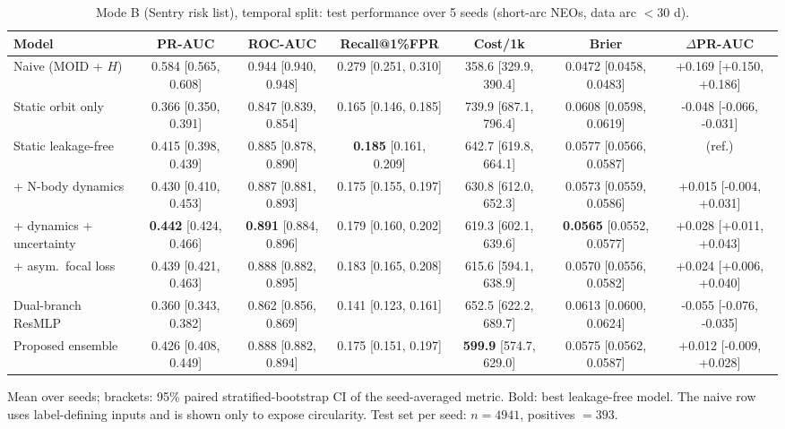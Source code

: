 \begin{table}[t]
\centering
\small
\caption{Mode B (Sentry risk list), temporal split: test performance over 5 seeds (short-arc NEOs, data arc $<30$ d).}
\label{tab:sentry_temporal_short_arc}
\begin{tabular}{lcccccc}
\toprule
Model & PR-AUC & ROC-AUC & Recall@1\%FPR & Cost/1k & Brier & $\Delta$PR-AUC \\
\midrule
Naive (MOID + $H$) & 0.584 \scriptsize{[0.565, 0.608]} & 0.944 \scriptsize{[0.940, 0.948]} & 0.279 \scriptsize{[0.251, 0.310]} & 358.6 \scriptsize{[329.9, 390.4]} & 0.0472 \scriptsize{[0.0458, 0.0483]} & +0.169 \scriptsize{[+0.150, +0.186]} \\
\midrule
Static orbit only & 0.366 \scriptsize{[0.350, 0.391]} & 0.847 \scriptsize{[0.839, 0.854]} & 0.165 \scriptsize{[0.146, 0.185]} & 739.9 \scriptsize{[687.1, 796.4]} & 0.0608 \scriptsize{[0.0598, 0.0619]} & -0.048 \scriptsize{[-0.066, -0.031]} \\
Static leakage-free & 0.415 \scriptsize{[0.398, 0.439]} & 0.885 \scriptsize{[0.878, 0.890]} & \textbf{0.185} \scriptsize{[0.161, 0.209]} & 642.7 \scriptsize{[619.8, 664.1]} & 0.0577 \scriptsize{[0.0566, 0.0587]} & (ref.) \\
+ N-body dynamics & 0.430 \scriptsize{[0.410, 0.453]} & 0.887 \scriptsize{[0.881, 0.893]} & 0.175 \scriptsize{[0.155, 0.197]} & 630.8 \scriptsize{[612.0, 652.3]} & 0.0573 \scriptsize{[0.0559, 0.0586]} & +0.015 \scriptsize{[-0.004, +0.031]} \\
+ dynamics + uncertainty & \textbf{0.442} \scriptsize{[0.424, 0.466]} & \textbf{0.891} \scriptsize{[0.884, 0.896]} & 0.179 \scriptsize{[0.160, 0.202]} & 619.3 \scriptsize{[602.1, 639.6]} & \textbf{0.0565} \scriptsize{[0.0552, 0.0577]} & +0.028 \scriptsize{[+0.011, +0.043]} \\
+ asym.\ focal loss & 0.439 \scriptsize{[0.421, 0.463]} & 0.888 \scriptsize{[0.882, 0.895]} & 0.183 \scriptsize{[0.165, 0.208]} & 615.6 \scriptsize{[594.1, 638.9]} & 0.0570 \scriptsize{[0.0556, 0.0582]} & +0.024 \scriptsize{[+0.006, +0.040]} \\
Dual-branch ResMLP & 0.360 \scriptsize{[0.343, 0.382]} & 0.862 \scriptsize{[0.856, 0.869]} & 0.141 \scriptsize{[0.123, 0.161]} & 652.5 \scriptsize{[622.2, 689.7]} & 0.0613 \scriptsize{[0.0600, 0.0624]} & -0.055 \scriptsize{[-0.076, -0.035]} \\
Proposed ensemble & 0.426 \scriptsize{[0.408, 0.449]} & 0.888 \scriptsize{[0.882, 0.894]} & 0.175 \scriptsize{[0.151, 0.197]} & \textbf{599.9} \scriptsize{[574.7, 629.0]} & 0.0575 \scriptsize{[0.0562, 0.0587]} & +0.012 \scriptsize{[-0.009, +0.028]} \\
\bottomrule
\end{tabular}
\par\vspace{2pt}\footnotesize Mean over seeds; brackets: 95\% paired stratified-bootstrap CI of the seed-averaged metric. Bold: best leakage-free model. The naive row uses label-defining inputs and is shown only to expose circularity. Test set per seed: $n=4941$, positives $=393$.
\end{table}
